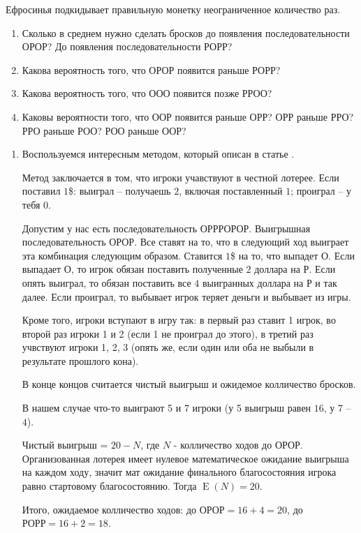 \documentclass[nobib]{tufte-handout}
\theoremstyle{definition}
\newcounter{problem}
\newenvironment{problem}%
{%
\refstepcounter{problem}%
     \hypertarget{problem:{\theproblem}}{}
     \Writetofile{solution_file}{\protect\hypertarget{soln:\theproblem}{}}
     \begin{myenum}[label=\bfseries\protect\hyperlink{soln:\theproblem}{\theproblem},ref=\theproblem]
     \item%
    }%
    {%
    \end{myenum}}
\DeclareMathOperator{\E}{E}
\begin{document}
\begin{problem}
Ефросинья подкидывает правильную монетку неограниченное количество раз.

\begin{enumerate}
\item Сколько в среднем нужно сделать бросков до появления последовательности ОРОР?
До появления последовательности РОРР?
\item Какова вероятность того, что ОРОР появится раньше РОРР?
\item Какова вероятность того, что ООО появится позже РРОО?
\item Каковы вероятности того, что ООР появится раньше ОРР? ОРР раньше РРО?
РРО раньше РОО? РОО раньше ООР?
\end{enumerate}

\begin{sol}
\begin{enumerate}
\item Воспользуемся интересным методом, который описан в статье \cite{li1980martingale}.

Метод заключается в том, что игроки учавствуют в честной лотерее.
Если поставил $1$\$: выиграл – получаешь $2$, включая поставленный $1$;
проиграл – у тебя $0$.

Допустим у нас есть последовательность ОРРРОРОР. Выигрышная последовательность ОРОР.
Все ставят на то, что в следующий ход выиграет эта комбинация следующим образом.
Ставится $1$\$ на то, что выпадет О. Если выпадает О,
то игрок обязан поставить полученные $2$ доллара на Р. Если опять выиграл,
то обязан поставить все $4$ выигранных доллара на Р и так далее.
Если проиграл, то выбывает игрок теряет деньги и выбывает из игры.

Кроме того, игроки вступают в игру так: в первый раз ставит 1 игрок,
во второй раз игроки 1 и 2 (если 1 не проиграл до этого),
в третий раз учвствуют игроки 1, 2, 3
(опять же, если один или оба не выбыли в результате прошлого кона).

В конце концов считается чистый выигрыш и ожидемое колличество бросков.

В нашем случае что-то выиграют 5 и 7 игроки (у 5 выигрыш равен $16$, у 7 – $4$).

Чистый выигрыш = $20 - N$, где $N$ - колличество ходов до ОРОР.
Организованная лотерея имеет нулевое математическое ожидание выигрыша на каждом ходу,
значит мат ожидание финального благосостояния игрока равно стартовому благосостоянию.
Тогда $\E(N) = 20$.

Итого, ожидаемое колличество ходов: до $\text{ОРОР} = 16 + 4 = 20$,
до $\text{РОРР} = 16 + 2 =18$.


\end{enumerate}
\end{sol}
\end{problem}
\end{document}
